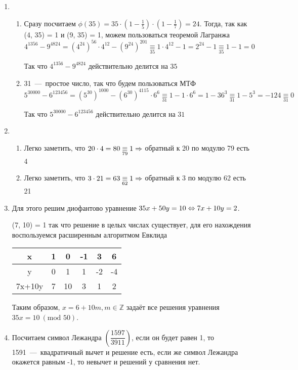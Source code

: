 \documentclass[a4paper,12pt]{article}
\begin{document}
\begin{solution}
	\begin{enumerate}
		\item \begin{enumerate}
			\item Сразу посчитаем $\phi(35) = 35 \cdot (1-\frac{1}{5}) \cdot (1-\frac17) = 24$. Тогда, так как (4, 35) = 1 и (9, 35) = 1, можем пользоваться теоремой Лагранжа \[4^{1356}-9^{4824} = (4^{24})^{56} \cdot 4^{12} - (9^{24})^{201} \underset{35}{\equiv} 1 \cdot 4^{12} - 1 = 2^{24} - 1 \underset{35}{\equiv} 1 - 1 = 0\]
			
			Так что $4^{1356}-9^{4824}$ действительно делится на $35$
			\item 31~---~простое число, так что будем пользоваться МТФ
			\[5^{30000} - 6^{123456} = (5^{30})^{1000} - (6^{30})^{4115} \cdot 6^6 \underset{31}{\equiv} 1 - 1\cdot 6^6 = 1 - 36^3 \underset{31}{\equiv} 1 - 5^3 = -124 \underset{31}{\equiv} 0\]
			
			Так что $5^{30000} - 6^{123456}$ действительно делится на $31$
		\end{enumerate}
	
	\item
	\begin{enumerate}
	\item Легко заметить, что $20 \cdot 4 = 80 \underset{79}{\equiv} 1 \Rightarrow$ обратный к 20 по модулю 79 есть 4
	\item Легко заметить, что $3 \cdot 21 = 63 \underset{62}{\equiv} 1 \Rightarrow$ обратный к 3 по модулю 62 есть 21
	\end{enumerate} 
	
	\item Для этого решим диофантово уравнение $35x + 50y = 10 \Leftrightarrow 7x + 10y = 2$.
	
	(7, 10) = 1 так что решение в целых числах существует, для его нахождения воспользуемся расширенным алгоритмом Евклида
	
	\begin{tabular}{|c|c|c|c|c|c|}
		\hline
		x& 1 & 0 & -1 & 3 & 6 \\
		\hline
		y& 0 & 1 & 1 & -2 & -4 \\
		\hline
		7x+10y& 7 & 10 & 3 & 1 & 2 \\
		\hline
	\end{tabular}
	
	Таким образом, $x = 6 + 10m, m \in \mathbb{Z}$ задаёт все решения уравнения $35x = 10 \ (\mbox{mod } 50)$.
	
	\item Посчитаем символ Лежандра $\left(\dfrac{1597}{3911}\right)$, если он будет равен 1, то 1591~---~квадратичный вычет и решение есть, если же символ Лежандра окажется равным -1, то невычет и решений у сравнения нет.
	

\end{enumerate}
\end{solution}
\end{document}
